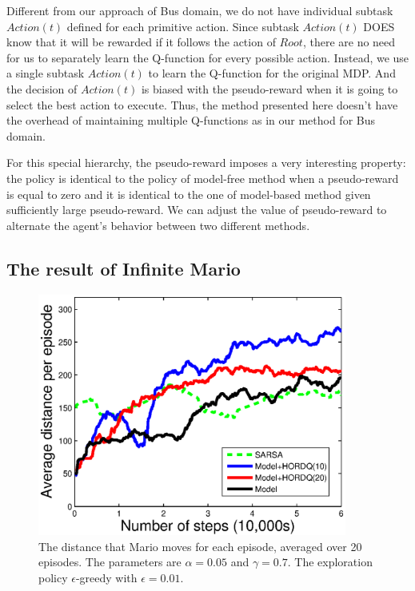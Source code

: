 Different from our approach of Bus domain, we do not have 
individual subtask $Action(t)$ defined for each primitive action. 
Since subtask $Action(t)$ DOES know that it will be rewarded if it follows 
the action of $Root$, there are no need for us to separately learn the Q-function for every possible action. 
Instead, we use a single subtask $Action(t)$ to learn the Q-function for the original MDP. 
And the decision of $Action(t)$ is biased with the pseudo-reward when it is going to select the best action to execute. 
Thus, the method presented here doesn't have the overhead of maintaining multiple Q-functions as in our method for Bus domain.


For this special hierarchy, the pseudo-reward imposes a very interesting property:
the policy is identical to the policy of model-free method when a pseudo-reward is equal to zero and
it is identical to the one of model-based method given sufficiently large pseudo-reward.
We can adjust the value of pseudo-reward to alternate the agent's behavior between
two different methods.


\subsection{The result of Infinite Mario}
\label{se:MarioRes}
\begin{figure}[t]
 \begin{minipage}[b]{1.0\linewidth}
    \begin{center}
    \includegraphics[width=4.0in] {./figures/1247.eps}
\end{center}
\end{minipage}

\caption{The distance that Mario moves for each episode, averaged over 20 episodes.
The parameters are $\alpha=0.05$ and $\gamma=0.7$. The exploration policy
$\epsilon$-greedy with $\epsilon = 0.01$.}
\label{fig:MarioExp}
\end{figure}



